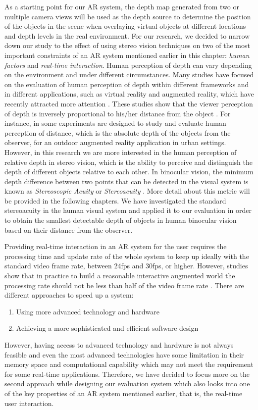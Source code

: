 As a starting point for our AR system, the depth map generated from two or multiple camera views
will be used as the depth source to determine the position of the objects in the scene when
overlaying virtual objects at different locations and depth levels in the real environment. 
For our research, we decided to narrow down our study to the effect of using stereo vision techniques
on two of the most important constraints of an AR system mentioned earlier in this chapter: 
{\it human factors} and {\it real-time interaction}. {\newline}
Human perception of depth can vary depending on the environment and under different circumstances. Many studies have focused on the evaluation of human perception of depth within different frameworks
and in different applications, such as virtual reality and augmented reality, which have recently 
attracted more attention \cite{wann95,dras96,liv05,jer05,swa07,kru10}.
These studies show that the viewer perception of depth
is inversely proportional to his/her distance from the object \cite{kru10,swa07,jer05,liv05}. For instance, in \cite{swa07} some experiments are designed to study and evaluate human
perception of distance, which is the absolute depth of the objects from the observer, for an outdoor augmented reality application in urban settings. 
However, in this research we are more interested in the human perception of relative depth in stereo vision, which is the ability to perceive and distinguish 
the depth of different objects relative to each other. 
In binocular vision, the minimum depth difference between two points 
that can be detected in the visual system is known as {\it Stereoscopic Acuity} or {\it Stereoacuity} \cite{pfa2000}. More detail about
this metric will be provided in the following chapters.
We have investigated the standard stereoacuity in the human visual system and applied it to our evaluation in order to obtain the smallest detectable depth of 
objects in human binocular vision based on their distance from the observer.

Providing real-time interaction in an AR system for the user requires the processing time and update rate of the whole system to keep up ideally with the standard video frame rate, 
between 24fps and 
30fps, or higher. 
However, studies show that in practice to build a reasonable interactive augmented world the processing rate should not be less than half of the video frame rate \cite{hertz00}. 
There are different approaches to speed up a system: 
\begin{enumerate}
\item Using more advanced technology and hardware
\item Achieving a more sophisticated and efficient software design
\end{enumerate}
However, having access to advanced technology and hardware is not always feasible and even the most advanced 
technologies have some limitation in their memory space and computational capability
which may not meet the requirement for some real-time applications. 
Therefore, we have decided to focus more on the second approach while designing our evaluation system which also looks into one of the
key properties of an AR system mentioned earlier, that is, the real-time user interaction.

